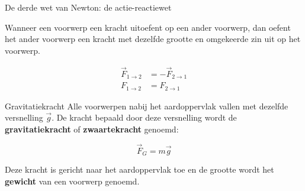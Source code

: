 \begin{lem}{De derde wet van Newton: de actie-reactiewet}

Wanneer een voorwerp een kracht uitoefent op een ander voorwerp, dan oefent het ander voorwerp een kracht met dezelfde grootte en omgekeerde zin uit op het voorwerp.

    \begin{align*}
        \Vec{F}_{1 \to 2} &= -\Vec{F}_{2 \to 1} \\
       F_{1 \to 2} &= F_{2 \to 1}
    \end{align*}

\end{lem}

\newpage

\begin{theo}[Gravitatiekracht]{Gravitatiekracht}
Alle voorwerpen nabij het aardoppervlak vallen met dezelfde versnelling $ \Vec{g} $. De kracht bepaald door deze versnelling wordt de \textbf{gravitatiekracht} of \textbf{zwaartekracht} genoemd:

    \begin{equation*}
        \Vec{F}_G = m\Vec{g}
    \end{equation*}

\noindent Deze kracht is gericht naar het aardoppervlak toe en de grootte wordt het \textbf{gewicht} van een voorwerp genoemd. 

\end{theo}

